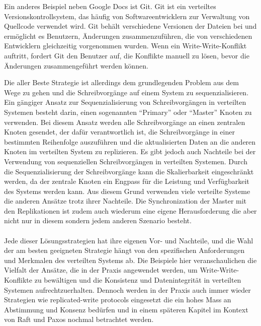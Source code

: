 \documentclass[../vs-script-first-v01.tex]{subfiles}
\begin{document}
\begin{itemize}
Ein anderes Beispiel neben Google Docs ist Git. Git ist ein verteiltes Versionskontrollsystem, das häufig von Softwareentwicklern zur Verwaltung von Quellcode verwendet wird. Git behält verschiedene Versionen der Dateien bei und ermöglicht es Benutzern, Änderungen zusammenzuführen, die von verschiedenen Entwicklern gleichzeitig vorgenommen wurden. Wenn ein Write-Write-Konflikt auftritt, fordert Git den Benutzer auf, die Konflikte manuell zu lösen, bevor die Änderungen zusammengeführt werden können.
\end{itemize}
Die aller Beste Strategie ist allerdings dem grundlegenden Problem aus dem Wege zu gehen und die Schreibvorgänge auf einem System zu sequenzialisieren. Ein gängiger Ansatz zur Sequenzialisierung von Schreibvorgängen in verteilten Systemen besteht darin, einen sogenannten \enquote{Primary} oder \enquote{Master} Knoten zu verwenden. Bei diesem Ansatz werden alle Schreibvorgänge an einen zentralen Knoten gesendet, der dafür verantwortlich ist, die Schreibvorgänge in einer bestimmten Reihenfolge auszuführen und die aktualisierten Daten an die anderen Knoten im verteilten System zu replizieren.
Es gibt jedoch auch Nachteile bei der Verwendung von sequenziellen Schreibvorgängen in verteilten Systemen. Durch die Sequenzialisierung der Schreibvorgänge kann die Skalierbarkeit eingeschränkt werden, da der zentrale Knoten ein Engpass für die Leistung und Verfügbarkeit des Systems werden kann. Aus diesem Grund verwenden viele verteilte Systeme die anderen Ansätze trotz ihrer Nachteile. Die Synchronization der Master mit den Replikationen ist zudem auch wiederum eine eigene Herausforderung die aber nicht nur in diesem sondern jedem anderen Szenario besteht.  
\\\\
Jede dieser Lösungsstrategien hat ihre eigenen Vor- und Nachteile, und die Wahl der am besten geeigneten Strategie hängt von den spezifischen Anforderungen und Merkmalen des verteilten Systems ab. Die Beispiele hier veranschaulichen die Vielfalt der Ansätze, die in der Praxis angewendet werden, um Write-Write-Konflikte zu bewältigen und die Konsistenz und Datenintegrität in verteilten Systemen aufrechtzuerhalten. Dennoch werden in der Praxis auch immer wieder Strategien wie replicated-write protocols eingesetzt die ein hohes Mass an Abstimmung und Konsenz bedürfen und in einem späteren Kapitel im Kontext von Raft und Paxos nochmal betrachtet werden.  
\end{document}
